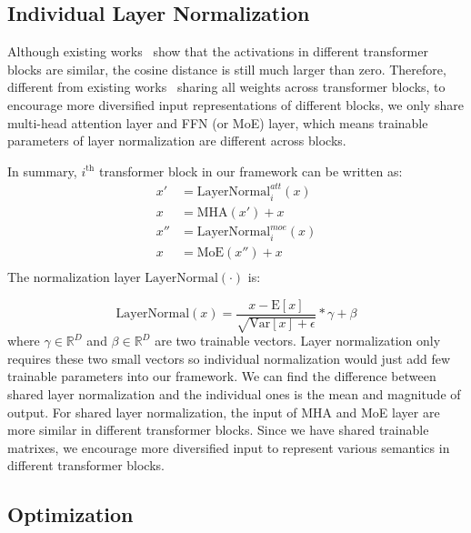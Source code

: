 \documentclass[letterpaper]{article} \usepackage{aaai22}  \usepackage{times}  \usepackage{helvet}  \usepackage{courier}  \usepackage[hyphens]{url}  \usepackage{graphicx} \urlstyle{rm} \def\UrlFont{\rm}  \usepackage{natbib}  \usepackage{caption} \DeclareCaptionStyle{ruled}{labelfont=normalfont,labelsep=colon,strut=off} \frenchspacing  \setlength{\pdfpagewidth}{8.5in}  \setlength{\pdfpageheight}{11in}  \usepackage{algorithm}
\begin{document}
\subsection{Individual Layer Normalization}
Although existing works~\citep{lan2019albert} show that the activations in different transformer blocks are similar, the cosine distance is still much larger than zero. Therefore, different from existing works~\citep{dehghani2018universal,lan2019albert} sharing all weights across transformer blocks, to encourage more diversified input representations of different blocks, we only share multi-head attention layer and FFN (or MoE) layer, which means trainable parameters of layer normalization are different across blocks. 

In summary, $i^{\mathrm{th}}$ transformer block in our framework can be written as:
\begin{equation}
\begin{aligned}
x' &= \mathrm{LayerNormal}^{att}_{i}(x) \\
x &= \mathrm{MHA}(x') + x\\
x''&= \mathrm{LayerNormal}^{moe}_{i}(x) \\
x &= \mathrm{MoE}(x'') + x\\
\end{aligned}
\end{equation}
The normalization layer $ \mathrm{LayerNormal}(\cdot)$ is:

\begin{equation}\label{eq:layer_norm}
\mathrm{LayerNormal}(x)=\frac{x-\mathrm{E}[x]}{\sqrt{\mathrm{Var}[x]+\epsilon}}*\gamma + \beta 
\end{equation}
where $\gamma \in \mathbb{R}^D$ and $\beta \in \mathbb{R}^D$ are two trainable vectors. Layer normalization only requires these two small vectors so individual normalization would just add few trainable parameters into our framework. We can find the difference between shared layer normalization and the individual ones is the mean and magnitude of output. For shared layer normalization, the input of MHA and MoE layer are more similar in different transformer blocks. Since we have shared trainable matrixes, we encourage more diversified input to represent various semantics in different transformer blocks. 


\subsection{Optimization}
\end{document}
